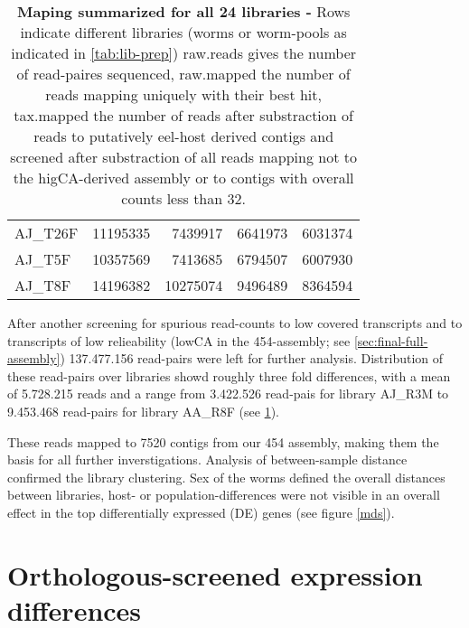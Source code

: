 \begin{table}[h]
\begin{center}
\begin{tabular}{llrrr}
  AJ\_T26F & 11195335 & 7439917 & 6641973 & 6031374 \\ 
  AJ\_T5F & 10357569 & 7413685 & 6794507 & 6007930 \\ 
  AJ\_T8F & 14196382 & 10275074 & 9496489 & 8364594 \\ 
   \hline
\end{tabular}
\caption[Mapping Summary]{\textbf{Maping summarized for all 24
    libraries -} Rows indicate different libraries (worms or
  worm-pools as indicated in \ref{tab:lib-prep}) raw.reads gives the
  number of read-paires sequenced, raw.mapped the number of reads
  mapping uniquely with their best hit, tax.mapped the number of reads
  after substraction of reads to putatively eel-host derived contigs
  and screened after substraction of all reads mapping not to the
  higCA-derived assembly or to contigs with overall counts less than
  32.}
\label{tab:read-clean}
\end{center}
\end{table}

After another screening for spurious read-counts to low covered
transcripts and to transcripts of low relieability (lowCA in the
454-assembly; see \ref{sec:final-full-assembly}) 137.477.156
read-pairs were left for further analysis. Distribution of these
read-pairs over libraries showd roughly three fold differences, with a
mean of 5.728.215 reads and a range from 3.422.526 read-pais for
library AJ\_R3M to 9.453.468 read-pairs for library AA\_R8F (see
\ref{tab:read-clean}).


These reads mapped to 7520 contigs from our 454 assembly, making them
the basis for all further inverstigations. Analysis of between-sample
distance confirmed the library clustering. Sex of the worms defined
the overall distances between libraries, host- or
population-differences were not visible in an overall effect in the
top differentially expressed (DE) genes (see figure \ref{mds}).

\section{Orthologous-screened expression differences}

